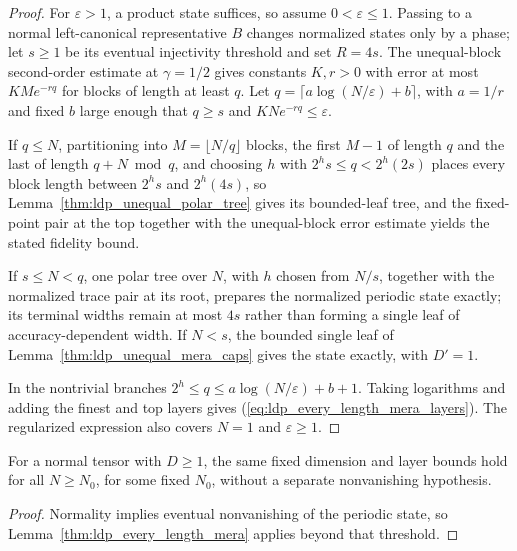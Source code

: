 \begin{proof}
    \leanok
    For $\varepsilon>1$, a product state suffices, so assume
    $0<\varepsilon\le1$. Passing to a normal left-canonical representative $B$ changes
    normalized states only by a phase; let $s\ge1$ be its
    eventual injectivity threshold and set $R=4s$. The unequal-block
    second-order estimate at $\gamma=1/2$ gives constants $K,r>0$
    with error at most $KM e^{-rq}$ for blocks of length at least $q$.
    Let $q=\lceil a\log(N/\varepsilon)+b\rceil$, with $a=1/r$
    and fixed $b$ large enough that $q\ge s$ and $KN e^{-rq}\le\varepsilon$.

    If $q\le N$, partitioning into $M=\lfloor N/q\rfloor$ blocks, the first
    $M-1$ of length $q$ and the last of length $q+N\bmod q$,
    and choosing $h$ with $2^h s\le q<2^h(2s)$ places every block length
    between $2^h s$ and $2^h(4s)$, so
    Lemma~\ref{thm:ldp_unequal_polar_tree} gives its bounded-leaf
    tree, and the fixed-point pair at the top together with the
    unequal-block error estimate yields the stated fidelity bound.

    If $s\le N<q$, one polar tree over $N$, with $h$ chosen
    from $N/s$, together with the normalized trace pair at its root, prepares the
    normalized periodic state exactly; its terminal widths remain at most $4s$
    rather than forming a single leaf of accuracy-dependent width.
    If $N<s$, the bounded single leaf of
    Lemma~\ref{thm:ldp_unequal_mera_caps} gives the state exactly,
    with $D'=1$.

    In the nontrivial branches $2^h\le q\le a\log(N/\varepsilon)+b+1$.
    Taking logarithms and adding the finest and top layers gives
    (\ref{eq:ldp_every_length_mera_layers}). The regularized expression
    also covers $N=1$ and $\varepsilon\ge1$.
\end{proof}

\begin{lemma}
    \label{thm:ldp_eventual_every_length_mera}
    \leanok
    For a normal tensor with $D\ge1$, the same fixed dimension and
    layer bounds hold for all $N\ge N_0$, for some fixed $N_0$,
    without a separate nonvanishing hypothesis.
\end{lemma}
\begin{proof}
    \leanok
    Normality implies eventual nonvanishing of the periodic state, so
    Lemma~\ref{thm:ldp_every_length_mera} applies beyond that threshold.
\end{proof}
